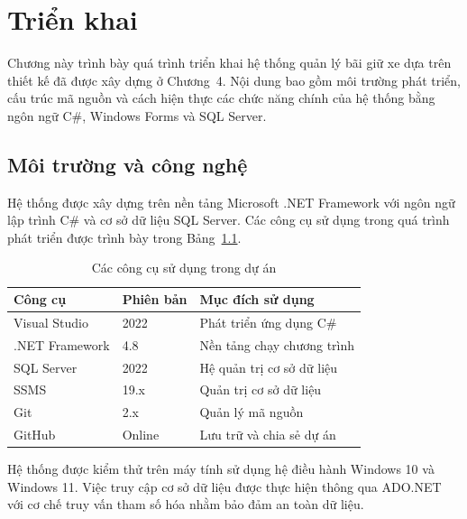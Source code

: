 \chapter{Triển khai}


Chương này trình bày quá trình triển khai hệ thống quản lý bãi giữ xe
dựa trên thiết kế đã được xây dựng ở Chương~4. Nội dung bao gồm môi
trường phát triển, cấu trúc mã nguồn và cách hiện thực các chức năng
chính của hệ thống bằng ngôn ngữ C\#, Windows Forms và SQL Server.

\section{Môi trường và công nghệ}

Hệ thống được xây dựng trên nền tảng Microsoft .NET Framework với
ngôn ngữ lập trình C\# và cơ sở dữ liệu SQL Server. Các công cụ sử
dụng trong quá trình phát triển được trình bày trong
Bảng~\ref{tab:congcu}.

\begin{table}[htbp]
    \centering
    \begin{tabular}{lll}
        \toprule
        \textbf{Công cụ} &
        \textbf{Phiên bản} &
        \textbf{Mục đích sử dụng} \\
        \midrule
        Visual Studio & 2022 & Phát triển ứng dụng C\# \\
        .NET Framework & 4.8 & Nền tảng chạy chương trình \\
        SQL Server & 2022 & Hệ quản trị cơ sở dữ liệu \\
        SSMS & 19.x & Quản trị cơ sở dữ liệu \\
        Git & 2.x & Quản lý mã nguồn \\
        GitHub & Online & Lưu trữ và chia sẻ dự án \\
        \bottomrule
    \end{tabular}
    \caption{Các công cụ sử dụng trong dự án}
    \label{tab:congcu}
\end{table}

Hệ thống được kiểm thử trên máy tính sử dụng hệ điều hành Windows 10
và Windows 11. Việc truy cập cơ sở dữ liệu được thực hiện thông qua
ADO.NET với cơ chế truy vấn tham số hóa nhằm bảo đảm an toàn dữ liệu.


